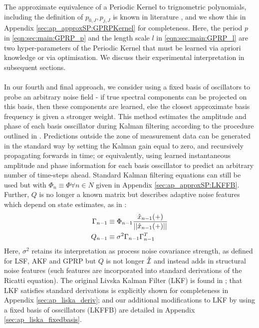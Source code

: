 The approximate equivalence of a Periodic Kernel to trignometric polynomials, including  the definition of $p_{0,J}, p_{j,J}$ is known in literature \cite{solin2014}, and we show this in Appendix \ref{sec:ap_approxSP:GPRPKernel} for completeness. Here, the period $p$ in \eqref{eqn:sec:main:GPRP_p} and the length scale $l$ in \eqref{eqn:sec:main:GPRP_l}  are two hyper-parameters of the Periodic Kernel that must be learned via apriori knowledge or via optimisation. We discuss their experimental interpretation in subsequent sections.
\\
\\
In our fourth and final approach, we consider using a fixed basis of oscillators to probe an arbitrary noise field - if true spectral components can be projected on this basis, then these components are learned, else the closest approximate basis frequency is given a stronger weight. This method estimates the amplitude and phase of each basis osscillator during Kalman filtering according to the procedure outlined in \cite{livska}. Predictions outside the zone of measurement data can be generated in the standard way by setting the Kalman gain equal to zero, and recursively propagating forwards in time; or equivalently, using learned instantaneous amplitude and phase information for each basis osscillator to predict an arbitrary number of time-steps ahead. Standard Kalman filtering equations can still be used but with $\Phi_n \equiv \Phi \forall n \in N$ given in Appendix \ref{sec:ap_approxSP:LKFFB}. Further, $Q$ is no longer a known matrix but describes adaptive noise features which depend on state estimates, as  in \cite{livska}: 
\begin{align}
\Gamma_{n-1} &\equiv \Phi_{n-1}\frac{\hat{x}_{n-1}(+)}{||\hat{x}_{n-1}(+)||} \\
Q_{n-1} & \equiv  \sigma^2 \Gamma_{n-1}\Gamma_{n-1}^T
\end{align}
Here, $\sigma^2$ retains its interpretation as process noise covariance strength, as defined for LSF, AKF and GPRP but $Q$ is not longer $\hat{\mathcal{I}}$ and instead adds in structural noise features (such features are incorporated into standard derivations of the Ricatti equation). 
The original Livska Kalman Filter (LKF) is found in \cite{livska}; that LKF satisfies standard derivations is explicitly shown for completeness in Appendix \ref{sec:ap_liska_deriv}; and our additional modifications to LKF by using a fixed basis of osscillators (LKFFB) are detailed in Appendix \ref{sec:ap_liska_fixedbasis}.
\\
\\
